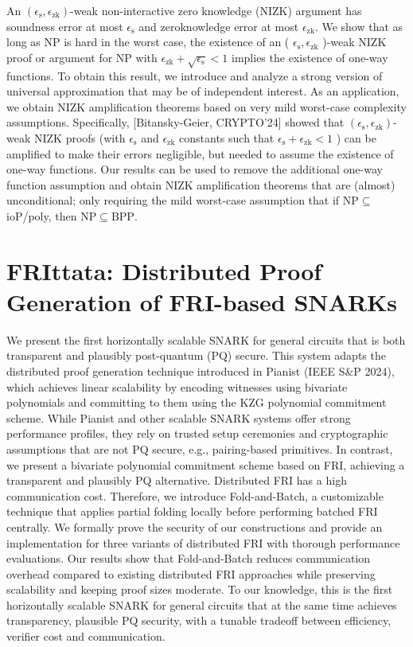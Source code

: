\documentclass[11pt]{article}
\theoremstyle{definition}
\theoremstyle{remark}
\theoremstyle{plain}
\begin{document}
An $\left(\epsilon_{\mathrm{s}}, \epsilon_{\mathrm{zk}}\right)$-weak non-interactive zero knowledge (NIZK) argument has soundness error at most $\epsilon_{\mathrm{s}}$ and zeroknowledge error at most $\epsilon_{\mathrm{zk}}$. We show that as long as NP is hard in the worst case, the existence of an ( $\epsilon_{\mathrm{s}}, \epsilon_{\mathrm{zk}}$ )-weak NIZK proof or argument for NP with $\epsilon_{\mathrm{zk}}+\sqrt{\epsilon_{\mathrm{s}}}<1$ implies the existence of one-way functions. To obtain this result, we introduce and analyze a strong version of universal approximation that may be of independent interest.
As an application, we obtain NIZK amplification theorems based on very mild worst-case complexity assumptions. Specifically, [Bitansky-Geier, CRYPTO'24] showed that $\left(\epsilon_{\mathrm{s}}, \epsilon_{\mathrm{zk}}\right)$-weak NIZK proofs (with $\epsilon_{\mathrm{s}}$ and $\epsilon_{\mathrm{zk}}$ constants such that $\epsilon_{\mathrm{s}}+\epsilon_{\mathrm{zk}}<1$ ) can be amplified to make their errors negligible, but needed to assume the existence of one-way functions. Our results can be used to remove the additional one-way function assumption and obtain NIZK amplification theorems that are (almost) unconditional; only requiring the mild worst-case assumption that if $\mathrm{NP} \subseteq$ ioP/poly, then $\mathrm{NP} \subseteq \mathrm{BPP}$.

\section{\cite{FRIttata} FRIttata: Distributed Proof Generation of FRI-based SNARKs}
We present the first horizontally scalable SNARK for general circuits that is both transparent and plausibly post-quantum (PQ) secure. This system adapts the distributed proof generation technique introduced in Pianist (IEEE S\&P 2024), which achieves linear scalability by encoding witnesses using bivariate polynomials and committing to them using the KZG polynomial commitment scheme. While Pianist and other scalable SNARK systems offer strong performance profiles, they rely on trusted setup ceremonies and cryptographic assumptions that are not PQ secure, e.g., pairing-based primitives. In contrast, we present a bivariate polynomial commitment scheme based on FRI, achieving a transparent and plausibly PQ alternative. Distributed FRI has a high communication cost. Therefore, we introduce Fold-and-Batch, a customizable technique that applies partial folding locally before performing batched FRI centrally. We formally prove the security of our constructions and provide an implementation for three variants of distributed FRI with thorough performance evaluations. Our results show that Fold-and-Batch reduces communication overhead compared to existing distributed FRI approaches while preserving scalability and keeping proof sizes moderate. To our knowledge, this is the first horizontally scalable SNARK for general circuits that at the same time achieves transparency, plausible PQ security, with a tunable tradeoff between efficiency, verifier cost and communication.
\end{document}
